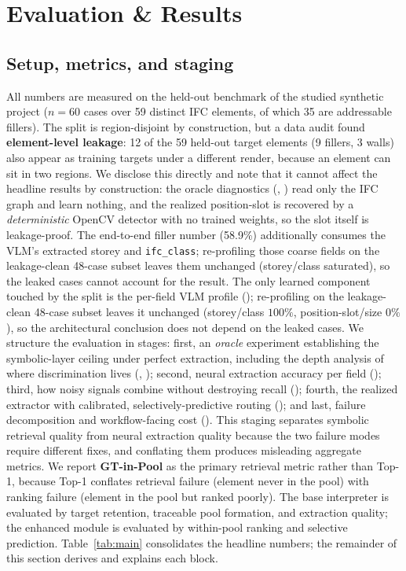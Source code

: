 \section{Evaluation \& Results}
\label{sec:eval}

\subsection{Setup, metrics, and staging}
\label{sec:eval-setup}

All numbers are measured on the held-out benchmark of the studied synthetic project ($n=60$ cases over
59 distinct IFC elements, of which 35 are addressable fillers). The split is region-disjoint by construction, but a
data audit found \textbf{element-level leakage}: 12 of the 59 held-out target elements (9 fillers, 3
walls) also appear as training targets under a different render, because an element can sit in two
regions. We disclose this directly and note that it cannot affect the headline results by
construction: the oracle diagnostics (, ) read only
the IFC graph and learn nothing, and the realized position-slot is recovered by a
\emph{deterministic} OpenCV detector with no trained weights, so the slot itself is leakage-proof.
The end-to-end filler number (58.9\%) additionally consumes the VLM's extracted storey and
\texttt{ifc\_class}; re-profiling those coarse fields on the leakage-clean 48-case subset leaves
them unchanged (storey/class saturated), so the leaked cases cannot account for the result. The
only learned component touched by the split is the per-field VLM profile
(); re-profiling on the leakage-clean 48-case subset leaves it unchanged
(storey/class $100\%$, position-slot/size $0\%$), so the architectural conclusion does not depend on
the leaked cases. We structure the
evaluation in stages: first, an \emph{oracle} experiment establishing the symbolic-layer ceiling under
perfect extraction, including the depth analysis of where discrimination lives
(, ); second, neural extraction accuracy per field
(); third, how noisy signals combine without destroying recall
(); fourth, the realized extractor with calibrated, selectively-predictive
routing (); and last,
failure decomposition and workflow-facing cost (). This staging separates
symbolic retrieval quality from neural extraction quality because the two failure modes require different
fixes, and conflating them produces misleading aggregate metrics. We report \textbf{GT-in-Pool} as the
primary retrieval metric rather than Top-1, because Top-1 conflates retrieval failure (element never
in the pool) with ranking failure (element in the pool but ranked poorly). The base interpreter is
evaluated by target retention, traceable pool formation, and extraction quality; the enhanced module is
evaluated by within-pool ranking and selective prediction. Table~\ref{tab:main} consolidates the
headline numbers; the remainder of this section derives and explains each block.

